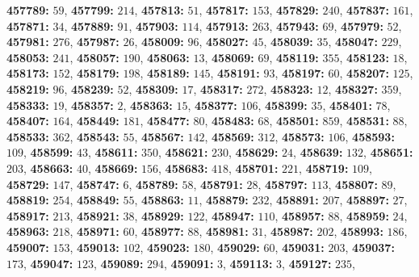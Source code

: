 \textsf{\bfseries 457789:} $59$, \textsf{\bfseries 457799:} $214$, \textsf{\bfseries 457813:} $51$, \textsf{\bfseries 457817:} $153$, \textsf{\bfseries 457829:} $240$, \textsf{\bfseries 457837:} $161$, \textsf{\bfseries 457871:} $34$, \textsf{\bfseries 457889:} $91$, \textsf{\bfseries 457903:} $114$, \textsf{\bfseries 457913:} $263$, \textsf{\bfseries 457943:} $69$, \textsf{\bfseries 457979:} $52$, \textsf{\bfseries 457981:} $276$, \textsf{\bfseries 457987:} $26$, \textsf{\bfseries 458009:} $96$, \textsf{\bfseries 458027:} $45$, \textsf{\bfseries 458039:} $35$, \textsf{\bfseries 458047:} $229$, \textsf{\bfseries 458053:} $241$, \textsf{\bfseries 458057:} $190$, \textsf{\bfseries 458063:} $13$, \textsf{\bfseries 458069:} $69$, \textsf{\bfseries 458119:} $355$, \textsf{\bfseries 458123:} $18$, \textsf{\bfseries 458173:} $152$, \textsf{\bfseries 458179:} $198$, \textsf{\bfseries 458189:} $145$, \textsf{\bfseries 458191:} $93$, \textsf{\bfseries 458197:} $60$, \textsf{\bfseries 458207:} $125$, \textsf{\bfseries 458219:} $96$, \textsf{\bfseries 458239:} $52$, \textsf{\bfseries 458309:} $17$, \textsf{\bfseries 458317:} $272$, \textsf{\bfseries 458323:} $12$, \textsf{\bfseries 458327:} $359$, \textsf{\bfseries 458333:} $19$, \textsf{\bfseries 458357:} $2$, \textsf{\bfseries 458363:} $15$, \textsf{\bfseries 458377:} $106$, \textsf{\bfseries 458399:} $35$, \textsf{\bfseries 458401:} $78$, \textsf{\bfseries 458407:} $164$, \textsf{\bfseries 458449:} $181$, \textsf{\bfseries 458477:} $80$, \textsf{\bfseries 458483:} $68$, \textsf{\bfseries 458501:} $859$, \textsf{\bfseries 458531:} $88$, \textsf{\bfseries 458533:} $362$, \textsf{\bfseries 458543:} $55$, \textsf{\bfseries 458567:} $142$, \textsf{\bfseries 458569:} $312$, \textsf{\bfseries 458573:} $106$, \textsf{\bfseries 458593:} $109$, \textsf{\bfseries 458599:} $43$, \textsf{\bfseries 458611:} $350$, \textsf{\bfseries 458621:} $230$, \textsf{\bfseries 458629:} $24$, \textsf{\bfseries 458639:} $132$, \textsf{\bfseries 458651:} $203$, \textsf{\bfseries 458663:} $40$, \textsf{\bfseries 458669:} $156$, \textsf{\bfseries 458683:} $418$, \textsf{\bfseries 458701:} $221$, \textsf{\bfseries 458719:} $109$, \textsf{\bfseries 458729:} $147$, \textsf{\bfseries 458747:} $6$, \textsf{\bfseries 458789:} $58$, \textsf{\bfseries 458791:} $28$, \textsf{\bfseries 458797:} $113$, \textsf{\bfseries 458807:} $89$, \textsf{\bfseries 458819:} $254$, \textsf{\bfseries 458849:} $55$, \textsf{\bfseries 458863:} $11$, \textsf{\bfseries 458879:} $232$, \textsf{\bfseries 458891:} $207$, \textsf{\bfseries 458897:} $27$, \textsf{\bfseries 458917:} $213$, \textsf{\bfseries 458921:} $38$, \textsf{\bfseries 458929:} $122$, \textsf{\bfseries 458947:} $110$, \textsf{\bfseries 458957:} $88$, \textsf{\bfseries 458959:} $24$, \textsf{\bfseries 458963:} $218$, \textsf{\bfseries 458971:} $60$, \textsf{\bfseries 458977:} $88$, \textsf{\bfseries 458981:} $31$, \textsf{\bfseries 458987:} $202$, \textsf{\bfseries 458993:} $186$, \textsf{\bfseries 459007:} $153$, \textsf{\bfseries 459013:} $102$, \textsf{\bfseries 459023:} $180$, \textsf{\bfseries 459029:} $60$, \textsf{\bfseries 459031:} $203$, \textsf{\bfseries 459037:} $173$, \textsf{\bfseries 459047:} $123$, \textsf{\bfseries 459089:} $294$, \textsf{\bfseries 459091:} $3$, \textsf{\bfseries 459113:} $3$, \textsf{\bfseries 459127:} $235$, 

